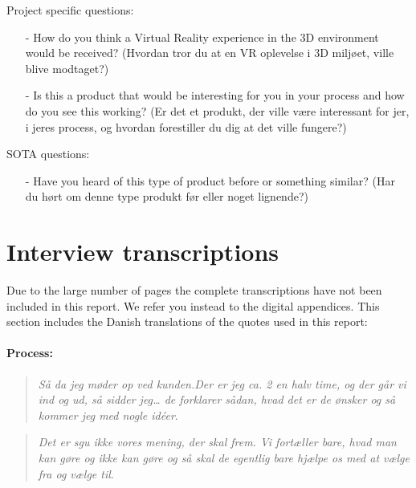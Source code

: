 Project specific questions:
\begin{itemize}
	\item[-] How do you think a Virtual Reality experience in the 3D environment would be received? (Hvordan tror du at en VR oplevelse i 3D miljøet, ville blive modtaget?)
	\item[-] Is this a product that would be interesting for you in your process and how do you see this working? (Er det et produkt, der ville være interessant for jer, i jeres process, og hvordan forestiller du dig at det ville fungere?)\\
\end{itemize}

SOTA questions:
\begin{itemize}
	\item[-] Have you heard of this type of product before or something similar? (Har du hørt om denne type produkt før eller noget lignende?)
\end{itemize}

\section{Interview transcriptions}\label{interviewTranscriptions}
Due to the large number of pages the complete transcriptions have not been included in this report. We refer you instead to the digital appendices. This section includes the Danish translations of the quotes used in this report:\\

\paragraph*{Process:}
\begin{quote}
	\textit{Så da jeg møder op ved kunden.Der er jeg ca. 2 en halv time, og der går vi ind og ud, så sidder jeg… de forklarer sådan, hvad det er de ønsker og så kommer jeg med nogle idéer}\label{quote:expertProcess1Danish}.\\
\end{quote}

\begin{quote}
	\textit{Det er sgu ikke vores mening, der skal frem. Vi fortæller bare, hvad man kan gøre og ikke kan gøre og så skal de egentlig bare hjælpe os med at vælge fra og vælge til}\label{quote:expertProcess2Danish}.\\
\end{quote}

